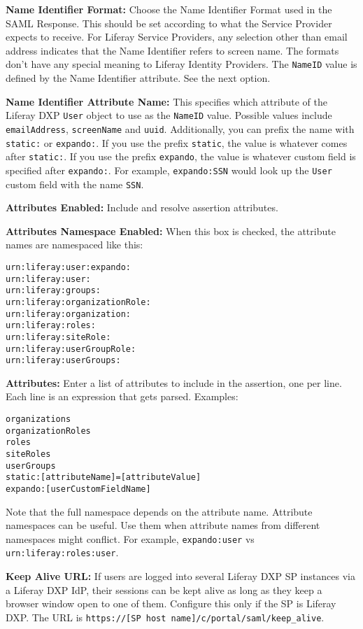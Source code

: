 \textbf{Name Identifier Format:} Choose the Name Identifier Format used
in the SAML Response. This should be set according to what the Service
Provider expects to receive. For Liferay Service Providers, any
selection other than email address indicates that the Name Identifier
refers to screen name. The formats don't have any special meaning to
Liferay Identity Providers. The \texttt{NameID} value is defined by the
Name Identifier attribute. See the next option.

\textbf{Name Identifier Attribute Name:} This specifies which attribute
of the Liferay DXP \texttt{User} object to use as the \texttt{NameID}
value. Possible values include \texttt{emailAddress},
\texttt{screenName} and \texttt{uuid}. Additionally, you can prefix the
name with \texttt{static:} or \texttt{expando:}. If you use the prefix
\texttt{static}, the value is whatever comes after \texttt{static:}. If
you use the prefix \texttt{expando}, the value is whatever custom field
is specified after \texttt{expando:}. For example, \texttt{expando:SSN}
would look up the \texttt{User} custom field with the name \texttt{SSN}.

\textbf{Attributes Enabled:} Include and resolve assertion attributes.

\textbf{Attributes Namespace Enabled:} When this box is checked, the
attribute names are namespaced like this:

\begin{verbatim}
urn:liferay:user:expando:
urn:liferay:user:
urn:liferay:groups:
urn:liferay:organizationRole:
urn:liferay:organization:
urn:liferay:roles:
urn:liferay:siteRole:
urn:liferay:userGroupRole:
urn:liferay:userGroups:
\end{verbatim}

\textbf{Attributes:} Enter a list of attributes to include in the
assertion, one per line. Each line is an expression that gets parsed.
Examples:

\begin{verbatim}
organizations
organizationRoles
roles
siteRoles
userGroups
static:[attributeName]=[attributeValue]
expando:[userCustomFieldName] 
\end{verbatim}

Note that the full namespace depends on the attribute name. Attribute
namespaces can be useful. Use them when attribute names from different
namespaces might conflict. For example, \texttt{expando:user} vs
\texttt{urn:liferay:roles:user}.

\textbf{Keep Alive URL:} If users are logged into several Liferay DXP SP
instances via a Liferay DXP IdP, their sessions can be kept alive as
long as they keep a browser window open to one of them. Configure this
only if the SP is Liferay DXP. The URL is
\texttt{https://{[}SP\ host\ name{]}/c/portal/saml/keep\_alive}.

